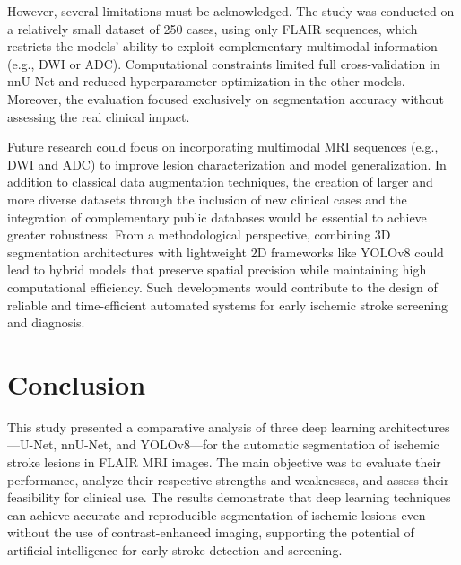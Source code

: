 \documentclass[12pt]{article}
\begin{document}
However, several limitations must be acknowledged. The study was conducted on a relatively small dataset of 250 cases, using only FLAIR sequences, which restricts the models’ ability to exploit complementary multimodal information (e.g., DWI or ADC). Computational constraints limited full cross-validation in nnU-Net and reduced hyperparameter optimization in the other models. Moreover, the evaluation focused exclusively on segmentation accuracy without assessing the real clinical impact.

Future research could focus on incorporating multimodal MRI sequences (e.g., DWI and ADC) to improve lesion characterization and model generalization. In addition to classical data augmentation techniques, the creation of larger and more diverse datasets through the inclusion of new clinical cases and the integration of complementary public databases would be essential to achieve greater robustness. From a methodological perspective, combining 3D segmentation architectures with lightweight 2D frameworks like YOLOv8 could lead to hybrid models that preserve spatial precision while maintaining high computational efficiency. Such developments would contribute to the design of reliable and time-efficient automated systems for early ischemic stroke screening and diagnosis.

\section{Conclusion} \label{sec:conclusion}


This study presented a comparative analysis of three deep learning architectures—U-Net, nnU-Net, and YOLOv8—for the automatic segmentation of ischemic stroke lesions in FLAIR MRI images. The main objective was to evaluate their performance, analyze their respective strengths and weaknesses, and assess their feasibility for clinical use. The results demonstrate that deep learning techniques can achieve accurate and reproducible segmentation of ischemic lesions even without the use of contrast-enhanced imaging, supporting the potential of artificial intelligence for early stroke detection and screening.
\end{document}
